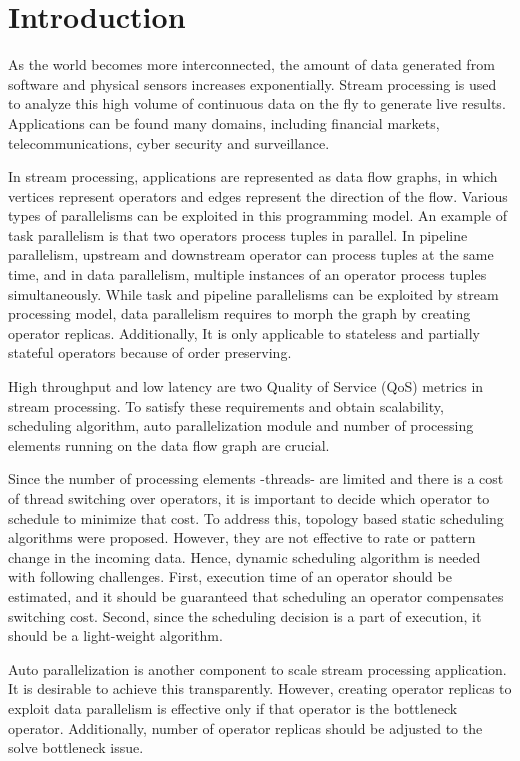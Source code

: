 \section{Introduction}\label{sec:introduction}

As the world becomes more interconnected, the amount of data generated from software and physical sensors increases exponentially. Stream processing is used to analyze this high volume of continuous data on the fly to generate live results. Applications can be found many domains, including financial markets, telecommunications, cyber security and surveillance.

In stream processing, applications are represented as data flow graphs, in which vertices represent operators and edges represent the direction of the flow. Various types of parallelisms can be exploited in this programming model. An example of task parallelism is that two operators process tuples in parallel. In pipeline parallelism, upstream and downstream operator can process tuples at the same time, and in data parallelism, multiple instances of an operator process tuples simultaneously. While task and pipeline parallelisms can be exploited by stream processing model, data parallelism requires to morph the graph by creating operator replicas. Additionally, It is only applicable to stateless and partially stateful operators because of order preserving.

High throughput and low latency are two Quality of Service (QoS) metrics in stream processing. To satisfy these requirements and obtain scalability, scheduling algorithm, auto parallelization module and number of processing elements running on the data flow graph are crucial.

Since the number of processing elements -threads- are limited and there is a cost of thread switching over operators, it is important to decide which operator to schedule to minimize that cost. To address this, topology based static scheduling algorithms were proposed. However, they are not effective to rate or pattern change in the incoming data. Hence, dynamic scheduling algorithm is needed with following challenges. First, execution time of an operator should be estimated, and it should be guaranteed that scheduling an operator compensates switching cost. Second, since the scheduling decision is a part of execution, it should be a light-weight algorithm.

Auto parallelization is another component to scale stream processing application. It is desirable to achieve this transparently. However, creating operator replicas to exploit data parallelism is effective only if that operator is the bottleneck operator. Additionally, number of operator replicas should be adjusted to the solve bottleneck issue.

